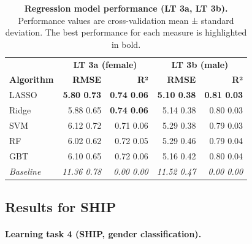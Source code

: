 \documentclass[
  oneside]{book}
\begin{document}
\begin{table}

\caption{\label{tab:09-performance-3}\textbf{Regression model performance (LT 3a, LT 3b).} Performance values are cross-validation mean ± standard deviation. The best performance for each measure is highlighted in bold.}
\centering
\begin{tabular}[t]{lrrrr}
\toprule
\multicolumn{1}{c}{\textbf{ }} & \multicolumn{2}{c}{\textbf{LT 3a (female)}} & \multicolumn{2}{c}{\textbf{LT 3b (male)}} \\
\cmidrule(l{3pt}r{3pt}){2-3} \cmidrule(l{3pt}r{3pt}){4-5}
\textbf{Algorithm} & \textbf{RMSE} & \textbf{R²} & \textbf{RMSE} & \textbf{R²}\\
\midrule
LASSO & \textbf{5.80 \textpm{} 0.73} & \textbf{0.74 \textpm{} 0.06} & \textbf{5.10 \textpm{} 0.38} & \textbf{0.81 \textpm{} 0.03}\\
Ridge & 5.88 \textpm{} 0.65 & \textbf{0.74 \textpm{} 0.06} & 5.14 \textpm{} 0.38 & 0.80 \textpm{} 0.03\\
SVM & 6.12 \textpm{} 0.72 & 0.71 \textpm{} 0.06 & 5.29 \textpm{} 0.38 & 0.79 \textpm{} 0.03\\
RF & 6.02 \textpm{} 0.62 & 0.72 \textpm{} 0.05 & 5.29 \textpm{} 0.46 & 0.79 \textpm{} 0.04\\
GBT & 6.10 \textpm{} 0.65 & 0.72 \textpm{} 0.06 & 5.16 \textpm{} 0.42 & 0.80 \textpm{} 0.04\\
\midrule
\addlinespace
\em{Baseline} & \em{11.36 \textpm{} 0.78} & \em{0.00 \textpm{} 0.00} & \em{11.52 \textpm{} 0.47} & \em{0.00 \textpm{} 0.00}\\
\bottomrule
\end{tabular}
\end{table}

\hypertarget{results-for-ship}{%
\subsection{Results for SHIP}\label{results-for-ship}}

\paragraph*{Learning task 4 (SHIP, gender classification).}
\end{document}
